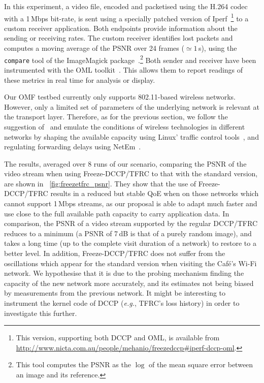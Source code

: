 \documentclass[twocolumn]{nictatechreport}
\newcommand{\latinlocution}[1]{\textit{#1}}
\newcommand{\eg}{\latinlocution{e.g.}}
\newcommand{\sysfun}[1]{\texttt{#1}}
\begin{document}
In this experiment, a video file, encoded and packetised using the H.264 codec
with a 1\,Mbps bit-rate, is sent using a specially patched version of
Iperf~\cite{2004gates_iperf2}\footnote{This version, supporting both DCCP and
OML, is available from
\url{http://www.nicta.com.au/people/mehanio/freezedccp\#iperf-dccp-oml}.} to a
custom receiver application. Both endpoints provide information about the
sending or receiving rates. The custom receiver identifies lost packets and
computes a moving average of the PSNR over 24 frames ($\simeq1$\,s), 
using the \sysfun{compare} tool of the ImageMagick
package~\cite{2005still_imagemagick}.\footnote{This tool computes the PSNR as
the $\log$ of the mean square error between an image and its reference.}
Both sender and receiver have been instrumented with the OML
toolkit~\cite{2013mehani_instrumentation_framework}. This allows them to report
readings of these metrics in real time for analysis or display.

Our OMF testbed currently only supports 802.11-based wireless networks.
However, only a limited set of parameters of the underlying network is relevant
at the transport layer. Therefore, as for the previous section, we follow the
suggestion of~\cite{2004gurtov_modelling_wireless} and emulate the conditions of
wireless technologies in different networks by shaping the available
capacity using Linux' traffic control tools~\cite{2004lartc_howto},  and
regulating forwarding delays using NetEm~\cite{2005hemminger_netem}.

The results, averaged over 8 runs of our scenario, comparing the PSNR of the
video stream when using Freeze-DCCP/TFRC to that with the standard version, are
shown in \figurename~\ref{fig:freezetfrc_psnr}. They show that the use of
Freeze-DCCP/TFRC results in a reduced but stable QoE when on those networks
which cannot support 1\,Mbps streams, as our proposal is able to adapt much
faster and use close to the full available path capacity to carry application
data. In comparison, the PSNR of a video stream supported by the regular
DCCP/TFRC reduces to a minimum (a PSNR of 7\,dB is that of a purely random
image), and takes a long time (up to the complete visit duration of a network)
to restore to a better level. In addition, Freeze-DCCP/TFRC does not suffer from
the oscillations which appear for the standard version when visiting the Café's
Wi-Fi network. We hypothesise that it is due to the probing mechanism finding
the capacity of the new network more accurately, and its estimates not being
biased by measurements from the previous network. It might be interesting to
instrument the kernel code of DCCP (\eg, TFRC's loss history) in order to
investigate this further.
\end{document}
